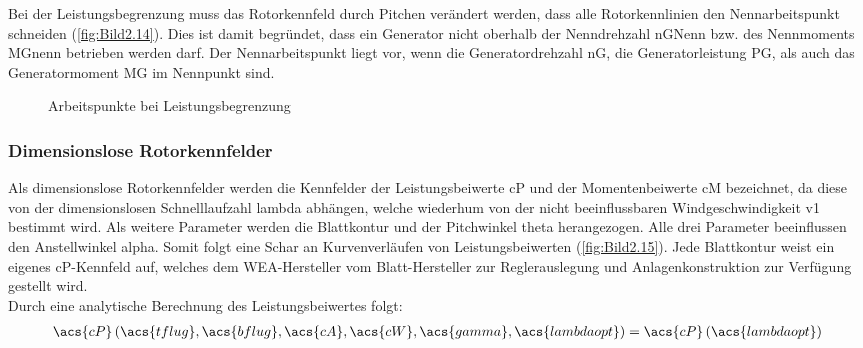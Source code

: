 Bei der Leistungsbegrenzung muss das Rotorkennfeld durch Pitchen verändert werden, dass alle Rotorkennlinien den Nennarbeitspunkt schneiden (\autoref{fig:Bild2.14}). Dies ist damit begründet, dass ein Generator nicht oberhalb der Nenndrehzahl \acs{nGNenn} bzw. des Nennmoments \acs{MGnenn} betrieben werden darf. Der Nennarbeitspunkt liegt vor, wenn die Generatordrehzahl \acs{nG}, die Generatorleistung \acs{PG}, als auch das Generatormoment \acs{MG} im Nennpunkt sind.
\begin{figure}[H]
   \centering
   \caption[Arbeitspunkte bei Leistungsbegrenzung]{Arbeitspunkte bei Leistungsbegrenzung \cite{SkriptSchulte}}
   \label{fig:Bild2.14}
\end{figure}

\subsubsection{Dimensionslose Rotorkennfelder}
Als dimensionslose Rotorkennfelder werden die Kennfelder der Leistungsbeiwerte \acs{cP} und der Momentenbeiwerte \acs{cM} bezeichnet, da diese von der dimensionslosen Schnelllaufzahl \acs{lambda} abhängen, welche wiederhum von der nicht beeinflussbaren Windgeschwindigkeit \acs{v1} bestimmt wird. Als weitere Parameter werden die Blattkontur und der Pitchwinkel \acs{theta} herangezogen. Alle drei Parameter beeinflussen den Anstellwinkel \acs{alpha}. Somit folgt eine Schar an Kurvenverläufen von Leistungsbeiwerten (\autoref{fig:Bild2.15}). Jede Blattkontur weist ein eigenes \acs{cP}-Kennfeld auf, welches dem WEA-Hersteller vom Blatt-Hersteller zur Reglerauslegung und Anlagenkonstruktion zur Verfügung gestellt wird.\\
\newline
Durch eine analytische Berechnung des Leistungsbeiwertes folgt:
\begin{align*}
    \acs{cP}\left(\acs{tflug}, \acs{bflug}, \acs{cA}, \acs{cW}, \acs{gamma}, \acs{lambdaopt}\right) = \acs{cP}\left(\acs{lambdaopt}\right)
\end{align*}


